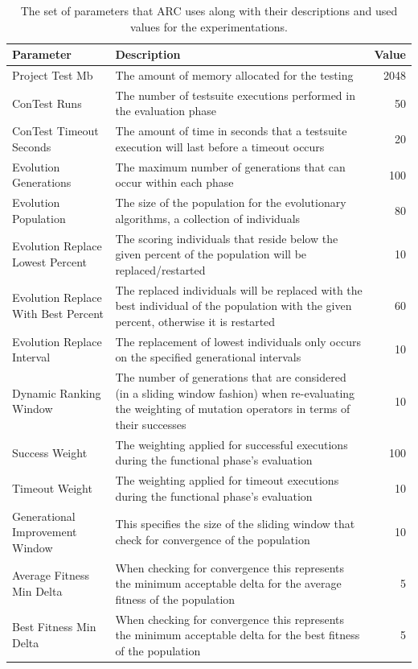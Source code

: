 \documentclass[10pt, conference, compsocconf]{IEEEtran}
\begin{document}
\begin{table}[!t]
\begin{center}
\begin{tabular}{|p{3cm}|p{10cm}|r|}
\hline
\textbf{Parameter} &
\textbf{Description} &
\textbf{Value}
\\\hline
Project Test Mb & The amount of memory allocated for the testing & 2048
\\\hline
ConTest Runs & The number of testsuite executions performed in the evaluation phase & 50
\\\hline
ConTest Timeout Seconds & The amount of time in seconds that a testsuite execution will last before a timeout occurs & 20
\\\hline
Evolution Generations & The maximum number of generations that can occur within each phase  & 100
\\\hline
Evolution Population & The size of the population for the evolutionary algorithms, a collection of individuals& 80
\\\hline
Evolution Replace Lowest Percent & The scoring individuals that reside below the given percent of the population will be replaced/restarted & 10
\\\hline
Evolution Replace With Best Percent & The replaced individuals will be replaced with the best individual of the population with the given percent, otherwise it is restarted & 60
\\\hline
Evolution Replace Interval & The replacement of lowest individuals only occurs on the specified generational intervals & 10
\\\hline
Dynamic Ranking Window & The number of generations that are considered (in a sliding window fashion) when re-evaluating the weighting of mutation operators in terms of their successes & 10
\\\hline
Success Weight & The weighting applied for successful executions during the functional phase's evaluation & 100
\\\hline
Timeout Weight & The weighting applied for timeout executions during the functional phase's evaluation & 10
\\\hline
Generational Improvement Window & This specifies the size of the sliding window that check for convergence of the population & 10
\\\hline
Average Fitness Min Delta & When checking for convergence this represents the minimum acceptable delta for the average fitness of the population & 5
\\\hline
Best Fitness Min Delta & When checking for convergence this represents the minimum acceptable delta for the best fitness of the population & 5 %
\\\hline
\end{tabular}
\caption{The set of parameters that ARC uses along with their descriptions and
used values for the experimentations.}
\label{tbl:used_parameters}
\end{center}
\end{table}
\end{document}
